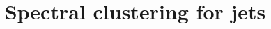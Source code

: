 \documentclass{article}
\begin{document}
\title{Spectral clustering for jets}
	
	\maketitle
	
     
    \FloatBarrier
    
    \FloatBarrier
    
    \FloatBarrier
    
    \FloatBarrier
    
    \FloatBarrier
    
    \FloatBarrier
    
    \FloatBarrier
    
    \FloatBarrier
    
    \FloatBarrier
    
    \printbibliography	
\end{document}
